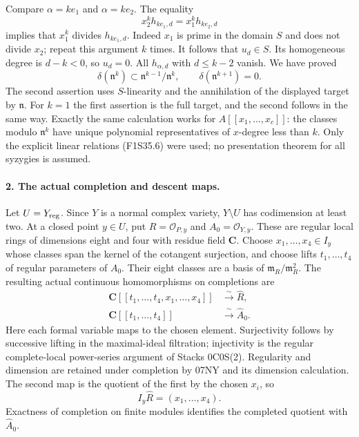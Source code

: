 Compare $\alpha=k e_1$ and $\alpha=k e_2$.
The equality
\[
          x_2^k h_{k e_1,d}
                       =x_1^k h_{k e_2,d}
 \tag{F1S35.7}
\]
implies that $x_1^k$ divides $h_{k e_1,d}$.
Indeed $x_1$ is prime in the domain $S$ and does
not divide $x_2$; repeat this argument $k$ times.
It follows that $u_d\in S$.
Its homogeneous degree is $d-k<0$, so $u_d=0$.
All $h_{\alpha,d}$ with $d\le k-2$ vanish.
We have proved
\[
 \delta(\mathfrak n^k)\subset
                    \mathfrak n^{k-1}/\mathfrak n^k,
 \qquad
 \delta(\mathfrak n^{k+1})=0.
 \tag{F1S35.8}
\]
The second assertion uses $S$-linearity and the
annihilation of the displayed target by
$\mathfrak n$.
For $k=1$ the first assertion is the full target,
and the second follows in the same way.
Exactly the same calculation works for
$A[[x_1,\ldots,x_c]]$: the classes modulo
$\mathfrak n^k$ have unique polynomial
representatives of $x$-degree less than $k$.
Only the explicit linear relations (F1S35.6)
were used; no presentation theorem for all
syzygies is assumed.

\paragraph{2. The actual completion and descent maps.}
Let $U=Y_{\rm reg}$. Since $Y$ is a normal
complex variety, $Y\setminus U$ has codimension
at least two. At a closed point $y\in U$,
put $R=\mathcal O_{P,y}$ and
$A_0=\mathcal O_{Y,y}$.
These are regular local rings of dimensions
eight and four with residue field $\mathbf C$.
Choose $x_1,\ldots,x_4\in I_y$ whose classes
span the kernel of the cotangent surjection,
and choose lifts $t_1,\ldots,t_4$ of regular
parameters of $A_0$.
Their eight classes are a basis of
$\mathfrak m_R/\mathfrak m_R^2$.
The resulting actual continuous homomorphisms
on completions are
\[
\begin{split}
 \mathbf C[[t_1,\ldots,t_4,x_1,\ldots,x_4]]
                          &\xrightarrow{\ \sim\ }\widehat R,\\
 \mathbf C[[t_1,\ldots,t_4]]
                          &\xrightarrow{\ \sim\ }\widehat A_0.
\end{split}
 \tag{F1S35.9}
\]
Here each formal variable maps to the chosen
element. Surjectivity follows by successive
lifting in the maximal-ideal filtration;
injectivity is the regular complete-local
power-series argument of Stacks 0C0S(2).
Regularity and dimension are retained under
completion by 07NY and its dimension calculation.
The second map is the quotient of the first
by the chosen $x_i$, so
\[
                  I_y\widehat R=(x_1,\ldots,x_4).
 \tag{F1S35.10}
\]
Exactness of completion on finite modules
identifies the completed quotient with
$\widehat A_0$.

